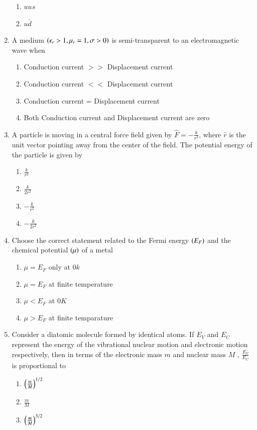 \documentclass[journal,12pt,onecolumn,article]{IEEEtran}
\theoremstyle{remark}
\begin{document}
\begin{enumerate}
\begin{enumerate}
			\item $uus$
			\item $u\bar{d}$
		\end{enumerate}
	\item A medium $\left(\epsilon_r > 1, \mu_r =1,\sigma >0\right)$ is semi-transparent to an electromagnetic wave when
		\begin{enumerate}
			\item Conduction current $>>$ Displacement current
			\item Conduction current $<<$ Displacement current
			\item Conduction current = Displacement current
			\item Both Conduction current and Displacement current are zero
		\end{enumerate}
	\item A particle is moving in a central force field given by $\hat{F} =-\frac{k}{r^3}$, where $\hat{r}$ is the unit vector pointing away from the center of the field. The potential energy of the particle is given by
		\begin{enumerate}
			\item $\frac{k}{r^2}$
			\item $\frac{k}{2r^2}$
			\item $-\frac{k}{r^2}$
			\item $-\frac{k}{2r^2}$
		\end{enumerate}
	\item Choose the correct statement related to the Fermi energy $\left(E_F\right)$ and the chemical potential $\left(\mu\right)$ of a metal
		\begin{enumerate}
			\item $\mu = E_F$ only at $0k$
			\item $\mu = E_F$ at finite temperature
			\item $\mu< E_F$ at $0K$
			\item $\mu > E_F$ at finite temparature
		\end{enumerate}
	\item Consider a diatomic molecule formed by identical atoms. If $E_V$ and $E_C$ represent the energy of the vibrational nuclear motion and electronic motion respectively, then in terms of the electronic mass $m$ and nuclear mass $M$ , $\frac{E_V}{E_C}$ is proportional to
		\begin{enumerate}
			\item $\left(\frac{m}{M}\right)^{1/2}$
			\item $\frac{m}{M}$
			\item $\left(\frac{m}{M}\right)^{3/2}$

\end{enumerate}
\end{enumerate}
\end{document}
